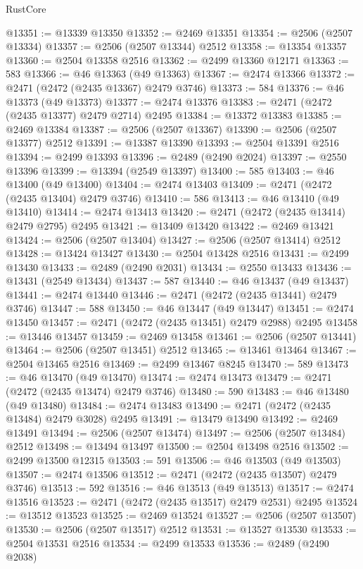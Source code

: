 \begin{lexlean}{RustCore}
\begin{coremodule}
@13351 := @13339 @13350
@13352 := @2469 @13351
@13354 := @2506 (@2507 @13334)
@13357 := @2506 (@2507 @13344) @2512
@13358 := @13354 @13357
@13360 := @2504 @13358 @2516
@13362 := @2499 @13360 @12171
@13363 := 583
@13366 := @46 @13363 (@49 @13363)
@13367 := @2474 @13366
@13372 := @2471 (@2472 (@2435 @13367) @2479 @3746)
@13373 := 584
@13376 := @46 @13373 (@49 @13373)
@13377 := @2474 @13376
@13383 := @2471 (@2472 (@2435 @13377) @2479 @2714) @2495
@13384 := @13372 @13383
@13385 := @2469 @13384
@13387 := @2506 (@2507 @13367)
@13390 := @2506 (@2507 @13377) @2512
@13391 := @13387 @13390
@13393 := @2504 @13391 @2516
@13394 := @2499 @13393
@13396 := @2489 (@2490 @2024)
@13397 := @2550 @13396
@13399 := @13394 (@2549 @13397)
@13400 := 585
@13403 := @46 @13400 (@49 @13400)
@13404 := @2474 @13403
@13409 := @2471 (@2472 (@2435 @13404) @2479 @3746)
@13410 := 586
@13413 := @46 @13410 (@49 @13410)
@13414 := @2474 @13413
@13420 := @2471 (@2472 (@2435 @13414) @2479 @2795) @2495
@13421 := @13409 @13420
@13422 := @2469 @13421
@13424 := @2506 (@2507 @13404)
@13427 := @2506 (@2507 @13414) @2512
@13428 := @13424 @13427
@13430 := @2504 @13428 @2516
@13431 := @2499 @13430
@13433 := @2489 (@2490 @2031)
@13434 := @2550 @13433
@13436 := @13431 (@2549 @13434)
@13437 := 587
@13440 := @46 @13437 (@49 @13437)
@13441 := @2474 @13440
@13446 := @2471 (@2472 (@2435 @13441) @2479 @3746)
@13447 := 588
@13450 := @46 @13447 (@49 @13447)
@13451 := @2474 @13450
@13457 := @2471 (@2472 (@2435 @13451) @2479 @2988) @2495
@13458 := @13446 @13457
@13459 := @2469 @13458
@13461 := @2506 (@2507 @13441)
@13464 := @2506 (@2507 @13451) @2512
@13465 := @13461 @13464
@13467 := @2504 @13465 @2516
@13469 := @2499 @13467 @8245
@13470 := 589
@13473 := @46 @13470 (@49 @13470)
@13474 := @2474 @13473
@13479 := @2471 (@2472 (@2435 @13474) @2479 @3746)
@13480 := 590
@13483 := @46 @13480 (@49 @13480)
@13484 := @2474 @13483
@13490 := @2471 (@2472 (@2435 @13484) @2479 @3028) @2495
@13491 := @13479 @13490
@13492 := @2469 @13491
@13494 := @2506 (@2507 @13474)
@13497 := @2506 (@2507 @13484) @2512
@13498 := @13494 @13497
@13500 := @2504 @13498 @2516
@13502 := @2499 @13500 @12315
@13503 := 591
@13506 := @46 @13503 (@49 @13503)
@13507 := @2474 @13506
@13512 := @2471 (@2472 (@2435 @13507) @2479 @3746)
@13513 := 592
@13516 := @46 @13513 (@49 @13513)
@13517 := @2474 @13516
@13523 := @2471 (@2472 (@2435 @13517) @2479 @2531) @2495
@13524 := @13512 @13523
@13525 := @2469 @13524
@13527 := @2506 (@2507 @13507)
@13530 := @2506 (@2507 @13517) @2512
@13531 := @13527 @13530
@13533 := @2504 @13531 @2516
@13534 := @2499 @13533
@13536 := @2489 (@2490 @2038)

\end{coremodule}
\end{lexlean}
